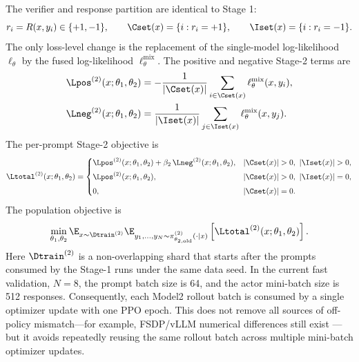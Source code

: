 The verifier and response partition are identical to Stage 1:
\begin{equation}
    r_i=R(x,y_i)\in\{+1,-1\},
    \qquad
    \Cset(x)=\{i:r_i=+1\},
    \qquad
    \Iset(x)=\{i:r_i=-1\}.
\end{equation}
The only loss-level change is the replacement of the single-model
log-likelihood $\ell_{\theta}$ by the fused log-likelihood
$\ell_{\theta}^{\mathrm{mix}}$. The positive and negative Stage-2 terms are
\begin{align}
    \Lpos^{(2)}(x;\theta_1,\theta_2)
    &=
    -\frac{1}{|\Cset(x)|}
    \sum_{i\in\Cset(x)}
    \ell_{\theta}^{\mathrm{mix}}(x,y_i),
    \label{eq:stage2-lpos}
    \\
    \Lneg^{(2)}(x;\theta_1,\theta_2)
    &=
    \frac{1}{|\Iset(x)|}
    \sum_{j\in\Iset(x)}
    \ell_{\theta}^{\mathrm{mix}}(x,y_j).
    \label{eq:stage2-lneg}
\end{align}
The per-prompt Stage-2 objective is
\begin{equation}
    \Ltotal^{(2)}(x;\theta_1,\theta_2)
    =
    \begin{cases}
    \Lpos^{(2)}(x;\theta_1,\theta_2)
    +\beta_2\,\Lneg^{(2)}(x;\theta_1,\theta_2),
        & |\Cset(x)|>0,\ |\Iset(x)|>0,\\[0.4em]
    \Lpos^{(2)}(x;\theta_1,\theta_2),
        & |\Cset(x)|>0,\ |\Iset(x)|=0,\\[0.4em]
    0,
        & |\Cset(x)|=0.
    \end{cases}
    \label{eq:stage2-total-loss}
\end{equation}
The population objective is
\begin{equation}
    \min_{\theta_1,\theta_2}
    \E_{x\sim\Dtrain^{(2)}}
    \E_{y_1,\ldots,y_N\sim \pi_{\theta_{2,\mathrm{old}}}^{(2)}(\cdot\mid x)}
    \left[
        \Ltotal^{(2)}(x;\theta_1,\theta_2)
    \right].
    \label{eq:stage2-objective}
\end{equation}
Here $\Dtrain^{(2)}$ is a non-overlapping shard that starts after the prompts
consumed by the Stage-1 runs under the same data seed. In the current fast
validation, $N=8$, the prompt batch size is 64, and the actor mini-batch size is
512 responses. Consequently, each Model2 rollout batch is consumed by a single
optimizer update with one PPO epoch. This does not remove all sources of
off-policy mismatch---for example, FSDP/vLLM numerical differences still exist
---but it avoids repeatedly reusing the same rollout batch across multiple
mini-batch optimizer updates.

